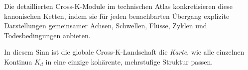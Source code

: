 Die detaillierten Cross-K-Module im technischen Atlas konkretisieren diese
kanonischen Ketten, indem sie für jeden benachbarten Übergang explizite
Darstellungen gemeinsamer Achsen, Schwellen, Flüsse, Zyklen und Todesbedingungen
anbieten.

In diesem Sinn ist die globale Cross-K-Landschaft die \emph{Karte}, wie alle
einzelnen Kontinua $K_d$ in eine einzige kohärente, mehrstufige Struktur passen.
